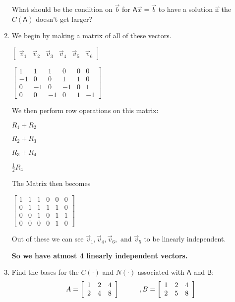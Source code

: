 \documentclass[a4paper, 11pt]{article}
\newcommand{\mat}[1]{\boldsymbol { \mathsf{#1}} }
\begin{document}
\begin{enumerate}
What should be the condition on $\vec b$ for $\mat A \vec x = \vec b$ to have a solution if the $C(\mat A)$ doesn't get larger?  

\item We begin by making a matrix of all of these vectors. 

\begin{center}

$
\begin{bmatrix}
\vec v_1 & \vec v_2 & \vec v_3 & \vec v_4 & \vec v_5 & \vec v_6  
\end{bmatrix}
$

$
\begin{bmatrix}
1 & 1 & 1 & 0 & 0 & 0 \\
-1 & 0 & 0 & 1 & 1 & 0\\
0 & -1 & 0 & -1 & 0 & 1\\ 
0 & 0 & -1 & 0 & 1 & -1 
\end{bmatrix}
$

\end{center}

We then perform row operations on this matrix:
\begin{center}
$R_1 + R_2$

$R_2 + R_3$

$R_3 + R_4$

$\frac{1}{2} R_4$
\end{center}

The Matrix then becomes 

\begin{center}
$
\begin{bmatrix}
1 & 1 & 1 & 0 & 0 & 0 \\
0 & 1 & 1 & 1 & 1 & 0\\
0 & 0 & 1 & 0 & 1 & 1\\ 
0 & 0 & 0 & 0 & 1 & 0 
\end{bmatrix}
$
\end{center}

Out of these we can see $\vec v_1, \vec v_4, \vec v_6,$ and $\vec v_5$ to be linearly independent.

\textbf{So we have atmost 4 linearly independent vectors.}


\item Find the bases for the $C(\mat \cdot)$ and $N(\mat \cdot)$ associated with $\mat A$ and $\mat B$:
\[ A = \left[ \begin{array}{ccc}
1&2&4\\
2&4&8
\end{array} \right]
\hspace{10mm}, B = \left[ \begin{array}{ccc}
1&2&4\\
2&5&8
\end{array} \right]\]


\end{enumerate}
\end{document}

